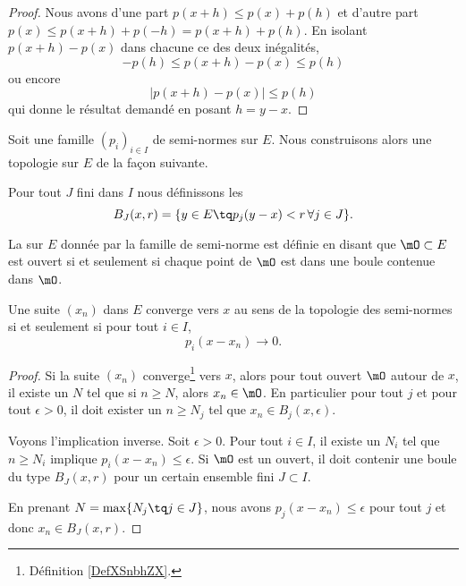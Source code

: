 \begin{proof}
    Nous avons d'une part \( p(x+h)\leq p(x)+p(h)\) et d'autre part \( p(x)\leq p(x+h)+p(-h)=p(x+h)+p(h)\). En isolant \( p(x+h)-p(x)\) dans chacune ce des deux inégalités,
    \begin{equation}
        -p(h)\leq p(x+h)-p(x)\leq p(h)
    \end{equation}
    ou encore
    \begin{equation}
        |p(x+h)-p(x)|\leq p(h)
    \end{equation}
    qui donne le résultat demandé en posant \( h=y-x\).
\end{proof}

Soit une famille \( (p_i)_{i\in I}\) de semi-normes sur \( E\). Nous construisons alors une topologie sur \( E\) de la façon suivante.

\begin{definition}
    Pour tout \( J\) fini dans \( I\) nous définissons les 
    \begin{equation}
        B_J(x,r)=\{ y\in E\tq p_j(y-x)<r\,\forall j\in J \}.
    \end{equation}

    La  sur \( E\) donnée par la famille de semi-norme est définie en disant que \( \mO\subset E\) est ouvert si et seulement si chaque point de \( \mO\) est dans une boule contenue dans \( \mO\).
\end{definition}

\begin{proposition} \label{PropQPzGKVk}
    Une suite \( (x_n)\) dans \( E\) converge vers \( x\) au sens de la topologie des semi-normes si et seulement si pour tout \( i\in I\),
    \begin{equation}
        p_i(x-x_n)\to 0.
    \end{equation}
\end{proposition}

\begin{proof}
    Si la suite \( (x_n)\) converge\footnote{Définition \ref{DefXSnbhZX}.} vers \( x\), alors pour tout ouvert \( \mO\) autour de \( x\), il existe un \( N\) tel que si \( n\geq N\), alors \( x_n\in\mO\). En particulier pour tout \( j\) et pour tout \( \epsilon>0\), il doit exister un \( n\geq N_j\) tel que \( x_n\in B_j(x,\epsilon)\).

    Voyons l'implication inverse. Soit \( \epsilon>0\). Pour tout \( i\in I\), il existe un \( N_i\) tel que \( n\geq N_i\) implique \( p_i(x-x_n)\leq \epsilon\). Si \( \mO\) est un ouvert, il doit contenir une boule du type \( B_J(x,r)\) pour un certain ensemble fini \( J\subset I\).

    En prenant \( N=\max\{ N_j\tq j\in J \}\), nous avons \( p_j(x-x_n)\leq \epsilon\) pour tout \( j\) et donc \( x_n\in B_J(x,r)\).
\end{proof}

